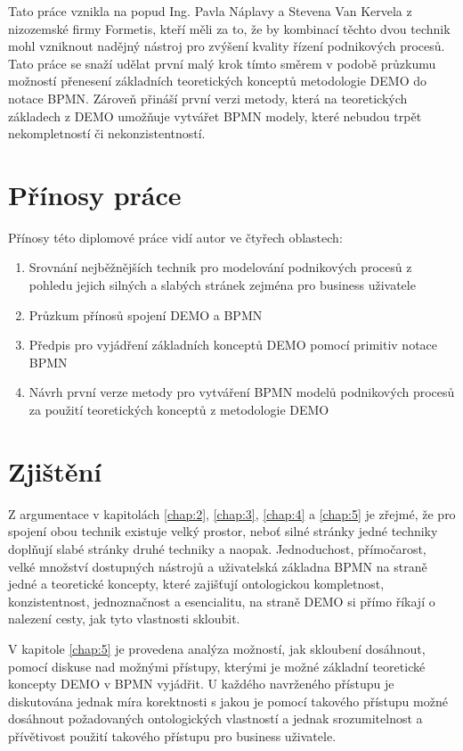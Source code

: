 Tato práce vznikla na popud Ing. Pavla Náplavy a Stevena Van Kervela z nizozemské firmy Formetis, kteří měli za to, že by kombinací těchto dvou technik mohl vzniknout nadějný nástroj pro zvýšení kvality řízení podnikových procesů. Tato práce se snaží udělat první malý krok tímto směrem v podobě průzkumu možností přenesení základních teoretických konceptů metodologie DEMO do notace BPMN. Zároveň přináší první verzi metody, která na teoretických základech z DEMO umožňuje vytvářet BPMN modely, které nebudou trpět nekompletností či nekonzistentností.

\section{Přínosy práce}
Přínosy této diplomové práce vidí autor ve čtyřech oblastech:

\begin{enumerate}
\item Srovnání nejběžnějších technik pro modelování podnikových procesů z pohledu jejich silných a slabých stránek zejména pro business uživatele
\item Průzkum přínosů spojení DEMO a BPMN
\item Předpis pro vyjádření základních konceptů DEMO pomocí primitiv notace BPMN
\item Návrh první verze metody pro vytváření BPMN modelů podnikových procesů za použití teoretických konceptů z metodologie DEMO
\end{enumerate}

\section{Zjištění}
Z argumentace v kapitolách \ref{chap:2}, \ref{chap:3}, \ref{chap:4} a \ref{chap:5} je zřejmé, že pro spojení obou technik existuje velký prostor, neboť silné stránky jedné techniky doplňují slabé stránky druhé techniky a naopak. Jednoduchost, přímočarost, velké množství dostupných nástrojů a uživatelská základna BPMN na straně jedné a teoretické koncepty, které zajišťují ontologickou kompletnost, konzistentnost, jednoznačnost a esencialitu, na straně DEMO si přímo říkají o nalezení cesty, jak tyto vlastnosti skloubit.

V kapitole \ref{chap:5} je provedena analýza možností, jak skloubení dosáhnout, pomocí diskuse nad možnými přístupy, kterými je možné základní teoretické koncepty DEMO v BPMN vyjádřit. U každého navrženého přístupu je diskutována jednak míra korektnosti s jakou je pomocí takového přístupu možné dosáhnout požadovaných ontologických vlastností a jednak srozumitelnost a přívětivost použití takového přístupu pro business uživatele. 

